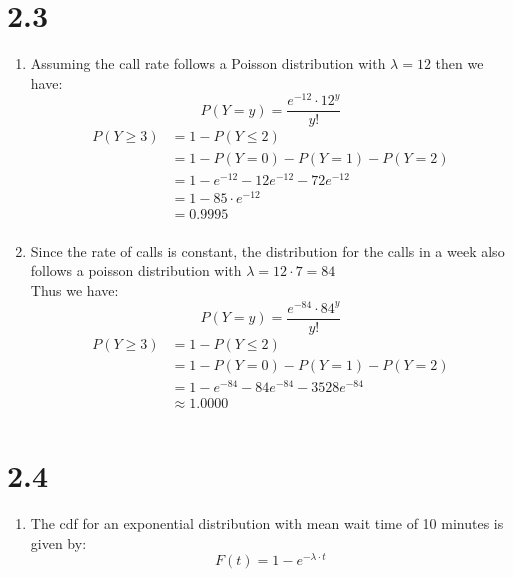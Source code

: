 \documentclass{article}
\begin{document}
\section*{2.3}
\begin{enumerate}
\item Assuming the call rate follows a Poisson distribution with $\lambda = 12$ then we have: \\
\[
P(Y = y) = \frac{e^{-12} \cdot 12^y}{y!}
\]
\begin{align*}
P(Y \geq 3) &= 1 - P(Y \leq 2) \\
&= 1 - P(Y = 0) - P(Y = 1) - P(Y = 2) \\
&= 1 - e^{-12} - 12e^{-12} - 72e^{-12} \\
&= 1 - 85 \cdot e^{-12} \\
&= 0.9995 \\
\end{align*}
\item Since the rate of calls is constant, the distribution for the calls in a week also follows a poisson distribution with $\lambda = 12 \cdot 7 = 84$ \\
Thus we have: \\
\[
P(Y = y) = \frac{e^{-84} \cdot 84^y}{y!}
\]
\begin{align*}
P(Y \geq 3) &= 1 - P(Y \leq 2) \\
&= 1 - P(Y = 0) - P(Y = 1) - P(Y = 2) \\
&= 1 - e^{-84} - 84e^{-84} - 3528e^{-84} \\
&\approx 1.0000 \\
\end{align*}
\end{enumerate}
\section*{2.4}
\begin{enumerate}
\item The cdf for an exponential distribution with mean wait time of 10 minutes is given by: \\
\[
F(t) = 1 - e^{-\lambda \cdot t}
\]

\end{enumerate}
\end{document}
